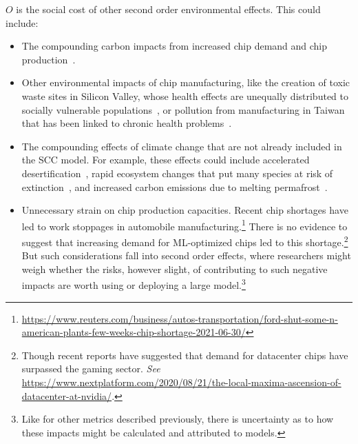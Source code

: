 $O$ is the social cost of other second order environmental effects. This could include:
\begin{itemize}
    \item The compounding carbon impacts from increased chip demand and chip production~\citep{gupta2021chasing}.
    \item Other environmental impacts of chip manufacturing, like the creation of toxic waste sites in 
 Silicon Valley, whose health effects are unequally distributed to socially vulnerable populations~\citep{stewart2014uneven}, or pollution from manufacturing in Taiwan that has been linked to chronic health problems~\citep{tu2009ineffective,lin2016increased}. 
 \item The compounding effects of climate change that are not already included in the SCC model. For example, these effects could include accelerated desertification~\cite{huang_accelerated_2016}, rapid ecosystem changes that put many species at risk of extinction~\cite{urban_accelerating_2015}, and increased carbon emissions due to melting permafrost~\citep{schuur_climate_2015}. 
 \item Unnecessary strain on chip production capacities. Recent chip shortages have led to work stoppages in automobile manufacturing.\footnote{\url{https://www.reuters.com/business/autos-transportation/ford-shut-some-n-american-plants-few-weeks-chip-shortage-2021-06-30/}} There is no evidence to suggest that increasing demand for ML-optimized chips led to this shortage.\footnote{Though recent reports have suggested that demand for datacenter chips have surpassed the gaming sector. \emph{See} \href{https://www.nextplatform.com/2020/08/21/the-local-maxima-ascension-of-datacenter-at-nvidia/}{https://www.nextplatform.com/2020/08/21/the-local-maxima-ascension-of-datacenter-at-nvidia/}.}
 But such considerations fall into second order effects, where researchers might weigh whether the risks, however slight, of contributing to such negative impacts are worth using or deploying a large model.\footnote{Like for other metrics described previously, there is uncertainty as to how these impacts might be calculated and attributed to models.}
\end{itemize}

